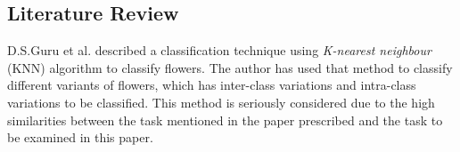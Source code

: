 \documentclass[9pt,technote]{IEEEtran}
\begin{document}
\subsection{Literature Review}
D.S.Guru et al. described a classification technique using \textit{K-nearest neighbour} (KNN) algorithm to classify flowers. \cite{guru2010texture} The author has used that method to classify different variants of flowers, which has inter-class variations and intra-class variations to be classified. This method is seriously considered due to the high similarities between the task mentioned in the paper prescribed and the task to be examined in this paper.


 

\end{document}
